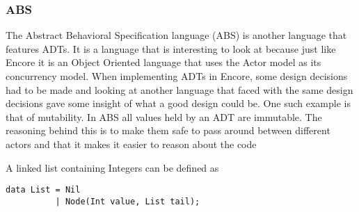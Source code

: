 \documentclass[10pt]{report}
\begin{document}
\subsubsection{ABS}%
\par{The Abstract Behavioral Specification language\cite{ABS} (ABS) is another language that features ADTs. It is a language that is interesting to look at because just like Encore it is an Object Oriented language that uses the Actor model as its concurrency model. When implementing ADTs in Encore, some design decisions had to be made and looking at another language that faced with the same design decisions gave some insight of what a good design could be. One such example is that of mutability. In ABS all values held by an ADT are immutable. The reasoning behind this is to make them safe to pass around between different actors and that it makes it easier to reason about the code\cite{ABSmut}}
\par{A linked list containing Integers can be defined as}
\begin{lstlisting}[language=encore,caption={Linked list in ABS}]
data List = Nil
          | Node(Int value, List tail);
\end{lstlisting}
\end{document}
